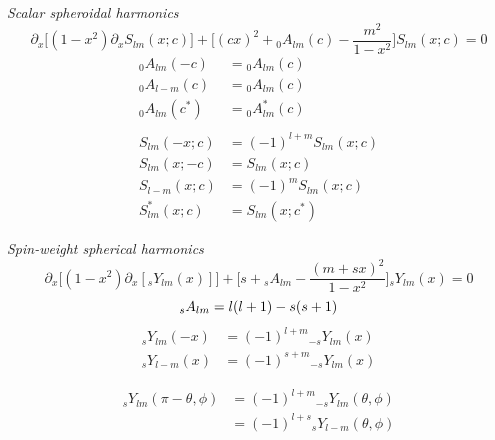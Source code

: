\documentclass[11pt]{article}
\begin{document}
\noindent
{\it Scalar spheroidal harmonics}\\
\begin{equation}
\partial_x \Big[ (1-x^2)\partial_x S_{lm}(x;c)\Big] + \bigg[(cx)^2 + {}_0A_{lm}(c) - \frac{m^2}{1-x^2}\bigg]S_{lm}(x;c) = 0
\end{equation}
\begin{align}
{}_0A_{lm}(-c) &= {}_0A_{lm}(c) \\
{}_0A_{l-m}(c) &= {}_0A_{lm}(c) \\
{}_0A_{lm}(c^*) &= {}_0A^*_{lm}(c) \\\nonumber\\
S_{lm}(-x;c) &= (-1)^{l+m} S_{lm}(x;c) \\
S_{lm}(x;-c) &= S_{lm}(x;c) \\
S_{l-m}(x;c) &= (-1)^m S_{lm}(x;c) \\
S^*_{lm}(x;c) &= S_{lm}(x;c^*)
\end{align}

\noindent
{\it Spin-weight spherical harmonics} \\
\begin{equation}
\partial_x \Big[ (1-x^2)\partial_x [{}_sY_{lm}(x)]\Big] + \bigg[s + {}_sA_{lm} - \frac{(m+sx)^2}{1-x^2}\bigg]{}_sY_{lm}(x) = 0
\end{equation}
\begin{equation}
{}_sA_{lm} = l(l+1) - s(s+1)\\
\end{equation}
\begin{align}
{}_{s}Y_{lm}(-x) &= (-1)^{l+m} {}_{-s}Y_{lm}(x) \\
{}_{s}Y_{l-m}(x) &= (-1)^{s+m} {}_{-s}Y_{lm}(x)
\end{align}

\begin{align} \label{sYlm:eq1}
{}_{s}Y_{lm}(\pi-\theta,\phi) &= (-1)^{l+m} {}_{-s}Y_{lm}(\theta, \phi) \\
\nonumber					  &= (-1)^{l+s} {}_{s}Y_{l-m}(\theta, \phi)
\end{align}
\end{document}
